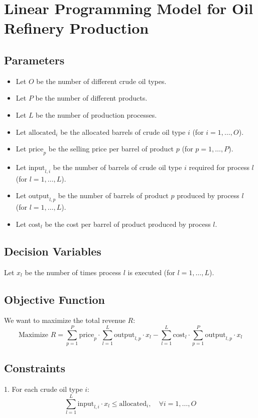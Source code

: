 \documentclass{article}
\begin{document}
\section*{Linear Programming Model for Oil Refinery Production}

\subsection*{Parameters}

\begin{itemize}
    \item Let \( O \) be the number of different crude oil types.
    \item Let \( P \) be the number of different products.
    \item Let \( L \) be the number of production processes.
    \item Let \( \text{allocated}_i \) be the allocated barrels of crude oil type \( i \) (for \( i = 1, \ldots, O \)).
    \item Let \( \text{price}_p \) be the selling price per barrel of product \( p \) (for \( p = 1, \ldots, P \)).
    \item Let \( \text{input}_{l,i} \) be the number of barrels of crude oil type \( i \) required for process \( l \) (for \( l = 1, \ldots, L \)).
    \item Let \( \text{output}_{l,p} \) be the number of barrels of product \( p \) produced by process \( l \) (for \( l = 1, \ldots, L \)).
    \item Let \( \text{cost}_l \) be the cost per barrel of product produced by process \( l \).
\end{itemize}

\subsection*{Decision Variables}
Let \( x_l \) be the number of times process \( l \) is executed (for \( l = 1, \ldots, L \)).

\subsection*{Objective Function}
We want to maximize the total revenue \( R \):
\[
\text{Maximize } R = \sum_{p=1}^{P} \text{price}_p \cdot \sum_{l=1}^{L} \text{output}_{l,p} \cdot x_l - \sum_{l=1}^{L} \text{cost}_l \cdot \sum_{p=1}^{P} \text{output}_{l,p} \cdot x_l
\]

\subsection*{Constraints}
1. For each crude oil type \( i \):
\[
\sum_{l=1}^{L} \text{input}_{l,i} \cdot x_l \leq \text{allocated}_i, \quad \forall i = 1, \ldots, O
\]
\end{document}
